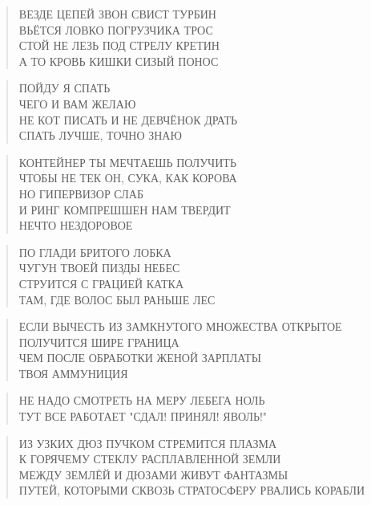 \poemtitle{***}
\begin{verse}
ВЕЗДЕ ЦЕПЕЙ ЗВОН СВИСТ ТУРБИН\\
ВЬЁТСЯ ЛОВКО ПОГРУЗЧИКА ТРОС\\
СТОЙ НЕ ЛЕЗЬ ПОД СТРЕЛУ КРЕТИН\\
А ТО КРОВЬ КИШКИ СИЗЫЙ ПОНОС
\end{verse}

\poemtitle{***}
\begin{verse}
ПОЙДУ Я СПАТЬ\\
ЧЕГО И ВАМ ЖЕЛАЮ\\
НЕ КОТ ПИСАТЬ И НЕ ДЕВЧЁНОК ДРАТЬ\\
СПАТЬ ЛУЧШЕ, ТОЧНО ЗНАЮ
\end{verse}

\poemtitle{***}
\begin{verse}
КОНТЕЙНЕР ТЫ МЕЧТАЕШЬ ПОЛУЧИТЬ\\
ЧТОБЫ НЕ ТЕК ОН, СУКА, КАК КОРОВА\\
НО ГИПЕРВИЗОР СЛАБ\\
И РИНГ КОМПРЕШШЕН НАМ ТВЕРДИТ\\
НЕЧТО НЕЗДОРОВОЕ
\end{verse}

\poemtitle{***}
\begin{verse}
ПО ГЛАДИ БРИТОГО ЛОБКА\\
ЧУГУН ТВОЕЙ ПИЗДЫ НЕБЕС \\
СТРУИТСЯ С ГРАЦИЕЙ КАТКА\\
ТАМ, ГДЕ ВОЛОС БЫЛ РАНЬШЕ ЛЕС
\end{verse}

\poemtitle{***}
\begin{verse}
ЕСЛИ ВЫЧЕСТЬ ИЗ ЗАМКНУТОГО МНОЖЕСТВА ОТКРЫТОЕ\\
ПОЛУЧИТСЯ ШИРЕ ГРАНИЦА\\
ЧЕМ ПОСЛЕ ОБРАБОТКИ ЖЕНОЙ ЗАРПЛАТЫ\\
ТВОЯ АММУНИЦИЯ
\end{verse}

\poemtitle{***}
\begin{verse}
НЕ НАДО СМОТРЕТЬ НА МЕРУ ЛЕБЕГА НОЛЬ\\
ТУТ ВСЕ РАБОТАЕТ "СДАЛ! ПРИНЯЛ! ЯВОЛЬ!"
\end{verse}

\poemtitle{***}
\begin{verse}
ИЗ УЗКИХ ДЮЗ ПУЧКОМ СТРЕМИТСЯ ПЛАЗМА\\
К ГОРЯЧЕМУ СТЕКЛУ РАСПЛАВЛЕННОЙ ЗЕМЛИ\\
МЕЖДУ ЗЕМЛЁЙ И ДЮЗАМИ  ЖИВУТ ФАНТАЗМЫ\\
ПУТЕЙ, КОТОРЫМИ СКВОЗЬ СТРАТОСФЕРУ РВАЛИСЬ КОРАБЛИ
\end{verse}

